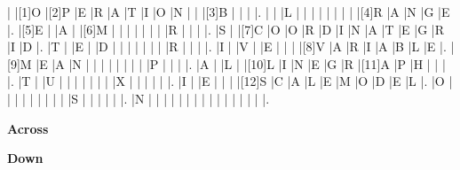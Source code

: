 \documentclass[11pt,twoside,a4paper]{exam}
\begin{document}
\begin{Puzzle}{16}{12}
|{}   |[1]O |[2]P |E  |R     |A  |T     |I  |O    |N  |{}    |{}   |[3]B |{} |{} |{} |.
|{}   |{}   |L    |{} |{}    |{} |{}    |{} |{}   |{} |{}    |[4]R |A    |N  |G  |E  |.
|[5]E |{}   |A    |{} |[6]M  |{} |{}    |{} |{}   |{} |{}    |{}   |R    |{} |{} |{} |.
|S    |{}   |[7]C |O  |O     |R  |D     |I  |N    |A  |T     |E    |G    |R  |I  |D  |.
|T    |{}   |E    |{} |D     |{} |{}    |{} |{}   |{} |{}    |{}   |R    |{} |{} |{} |.
|I    |{}   |V    |{} |E     |{} |{}    |{} |[8]V |A  |R     |I    |A    |B  |L  |E  |.
|[9]M |E    |A    |N  |{}    |{} |{}    |{} |{}   |{} |{}    |{}   |P    |{} |{} |{} |.
|A    |{}   |L    |{} |[10]L |I  |N     |E  |G    |R  |[11]A |P    |H    |{} |{} |{} |.
|T    |{}   |U    |{} |{}    |{} |{}    |{} |{}   |{} |X     |{}   |{}   |{} |{} |{} |.
|I    |{}   |E    |{} |{}    |{} |[12]S |C  |A    |L  |E     |M    |O    |D  |E  |L  |.
|O    |{}   |{}   |{} |{}    |{} |{}    |{} |{}   |{} |S     |{}   |{}   |{} |{} |{} |.
|N    |{}   |{}   |{} |{}    |{} |{}    |{} |{}   |{} |{}    |{}   |{}   |{} |{} |{} |.
\end{Puzzle}

\begin{PuzzleClues}{\textbf{Across}}
\end{PuzzleClues}

\begin{PuzzleClues}{\textbf{Down}}
\end{PuzzleClues}
\end{document}
